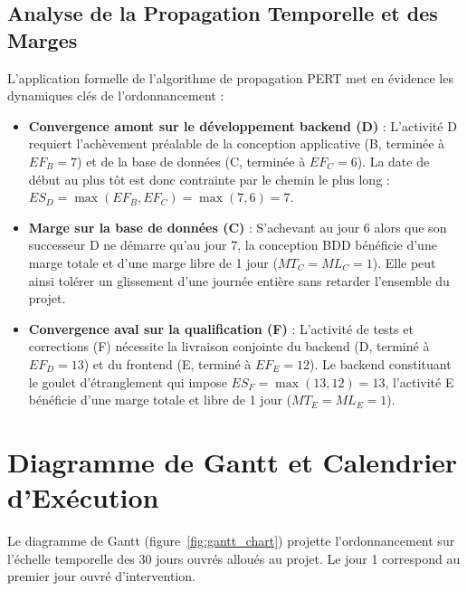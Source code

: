 \documentclass[a4paper,12pt]{report}
\begin{document}
	\subsection{Analyse de la Propagation Temporelle et des Marges}
	L'application formelle de l'algorithme de propagation PERT met en évidence les dynamiques clés de l'ordonnancement :
	\begin{itemize}[leftmargin=1.2cm, noitemsep]
		\item \textbf{Convergence amont sur le développement backend (D)} : L'activité D requiert l'achèvement préalable de la conception applicative (B, terminée à $EF_B = 7$) et de la base de données (C, terminée à $EF_C = 6$). La date de début au plus tôt est donc contrainte par le chemin le plus long : $ES_D = \max(EF_B, EF_C) = \max(7, 6) = 7$.
		\item \textbf{Marge sur la base de données (C)} : S'achevant au jour 6 alors que son successeur D ne démarre qu'au jour 7, la conception BDD bénéficie d'une marge totale et d'une marge libre de 1 jour ($MT_C = ML_C = 1$). Elle peut ainsi tolérer un glissement d'une journée entière sans retarder l'ensemble du projet.
		\item \textbf{Convergence aval sur la qualification (F)} : L'activité de tests et corrections (F) nécessite la livraison conjointe du backend (D, terminé à $EF_D = 13$) et du frontend (E, terminé à $EF_E = 12$). Le backend constituant le goulet d'étranglement qui impose $ES_F = \max(13, 12) = 13$, l'activité E bénéficie d'une marge totale et libre de 1 jour ($MT_E = ML_E = 1$).
	\end{itemize}
	
	\clearpage
	\section{Diagramme de Gantt et Calendrier d'Exécution}
	Le diagramme de Gantt (figure~\ref{fig:gantt_chart}) projette l'ordonnancement sur l'échelle temporelle des 30 jours ouvrés alloués au projet. Le jour 1 correspond au premier jour ouvré d'intervention.
	
\end{document}
